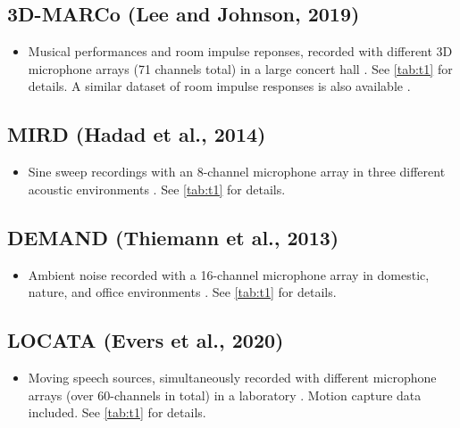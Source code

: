 \documentclass[14pt, legalpaper]{extarticle}
\begin{document}
\subsection{3D-MARCo (Lee and Johnson, 2019)}

\begin{itemize}

\item Musical performances and room impulse reponses, recorded with different 3D microphone arrays (71 channels total) in a large concert hall \cite{lee3d}. See \ref{tab:t1} for details. A similar dataset of room impulse responses is also available \cite{lee2017microphone}.

\end{itemize}

\subsection{MIRD (Hadad et al., 2014)}

\begin{itemize}

\item Sine sweep recordings with an 8-channel microphone array in three different acoustic environments \cite{hadad2014multichannel}. See \ref{tab:t1} for details.

\end{itemize}

\subsection{DEMAND (Thiemann et al., 2013)}

\begin{itemize}

\item Ambient noise recorded with a 16-channel microphone array in domestic, nature, and office environments \cite{thiemann2013demand}. See \ref{tab:t1} for details.

\end{itemize}

\subsection{LOCATA (Evers et al., 2020)}

\begin{itemize}

\item Moving speech sources, simultaneously recorded with different microphone arrays (over 60-channels in total) in a laboratory \cite{evers2020data}. Motion capture data included. See \ref{tab:t1} for details.

\end{itemize}
\end{document}
